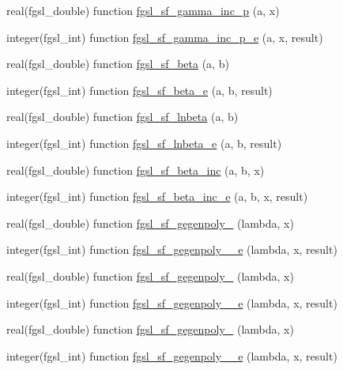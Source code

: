 \begin{DoxyCompactItemize}
\item 
real(fgsl\+\_\+double) function \hyperlink{specfunc_8finc_acb9d3ffcf38260a1cb629bc3cdad20fe}{fgsl\+\_\+sf\+\_\+gamma\+\_\+inc\+\_\+p} (a, x)
\item 
integer(fgsl\+\_\+int) function \hyperlink{specfunc_8finc_a15c354c5d960189a152fe6f30725ff75}{fgsl\+\_\+sf\+\_\+gamma\+\_\+inc\+\_\+p\+\_\+e} (a, x, result)
\item 
real(fgsl\+\_\+double) function \hyperlink{specfunc_8finc_aa79e39f5567af8b628834fb638933f38}{fgsl\+\_\+sf\+\_\+beta} (a, b)
\item 
integer(fgsl\+\_\+int) function \hyperlink{specfunc_8finc_a22f4a85b4d7a1d80ca0154875042bb7e}{fgsl\+\_\+sf\+\_\+beta\+\_\+e} (a, b, result)
\item 
real(fgsl\+\_\+double) function \hyperlink{specfunc_8finc_abc0af8d0d6c3904815ed1e74467e1144}{fgsl\+\_\+sf\+\_\+lnbeta} (a, b)
\item 
integer(fgsl\+\_\+int) function \hyperlink{specfunc_8finc_af3a95042172ed33f922f0c3e24fca696}{fgsl\+\_\+sf\+\_\+lnbeta\+\_\+e} (a, b, result)
\item 
real(fgsl\+\_\+double) function \hyperlink{specfunc_8finc_a5530256039c61d1851614d87d23f5217}{fgsl\+\_\+sf\+\_\+beta\+\_\+inc} (a, b, x)
\item 
integer(fgsl\+\_\+int) function \hyperlink{specfunc_8finc_a75c70bd54700019f07ed1032bbb01041}{fgsl\+\_\+sf\+\_\+beta\+\_\+inc\+\_\+e} (a, b, x, result)
\item 
real(fgsl\+\_\+double) function \hyperlink{specfunc_8finc_ad13551ab56b61fef8c1ad859db6a587f}{fgsl\+\_\+sf\+\_\+gegenpoly\+\_} (lambda, x)
\item 
integer(fgsl\+\_\+int) function \hyperlink{specfunc_8finc_aa644625cd39347bf093362807bbca584}{fgsl\+\_\+sf\+\_\+gegenpoly\+\_\+\_\+e} (lambda, x, result)
\item 
real(fgsl\+\_\+double) function \hyperlink{specfunc_8finc_acb63c00b5218df04dc6c416a8520c266}{fgsl\+\_\+sf\+\_\+gegenpoly\+\_} (lambda, x)
\item 
integer(fgsl\+\_\+int) function \hyperlink{specfunc_8finc_ad85f6557dac4edb6b33bba6aba5bab2a}{fgsl\+\_\+sf\+\_\+gegenpoly\+\_\+\_\+e} (lambda, x, result)
\item 
real(fgsl\+\_\+double) function \hyperlink{specfunc_8finc_aa1b13aeb26a6ee235072177a9b63abf0}{fgsl\+\_\+sf\+\_\+gegenpoly\+\_} (lambda, x)
\item 
integer(fgsl\+\_\+int) function \hyperlink{specfunc_8finc_a0258d23ae548968fb79d4508cd0b3fca}{fgsl\+\_\+sf\+\_\+gegenpoly\+\_\+\_\+e} (lambda, x, result)

\end{DoxyCompactItemize}
